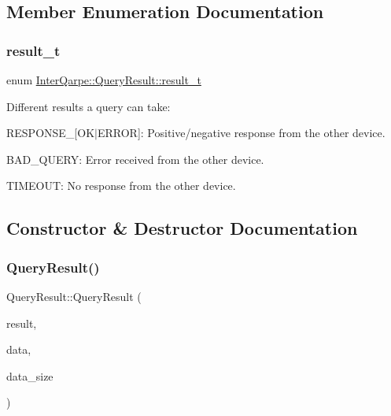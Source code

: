 \subsection{Member Enumeration Documentation}
\mbox{\label{classInterQarpe_1_1QueryResult_ad265093e5dea69f229df989d4e18cbb4}} 
\subsubsection{\texorpdfstring{result\+\_\+t}{result\_t}}
{\footnotesize\ttfamily enum \hyperlink{classInterQarpe_1_1QueryResult_ad265093e5dea69f229df989d4e18cbb4}{Inter\+Qarpe\+::\+Query\+Result\+::result\+\_\+t}}

Different results a query can take\+:
\begin{DoxyItemize}
\item R\+E\+S\+P\+O\+N\+S\+E\+\_\+\mbox{[}O\+K$\vert$\+E\+R\+R\+OR\mbox{]}\+: Positive/negative response from the other device.
\item B\+A\+D\+\_\+\+Q\+U\+E\+RY\+: Error received from the other device.
\item T\+I\+M\+E\+O\+UT\+: No response from the other device. 
\end{DoxyItemize}

\subsection{Constructor \& Destructor Documentation}
\mbox{\label{classInterQarpe_1_1QueryResult_a352263dc06a25fbb1c6ac075ac8a7420}} 
\subsubsection{\texorpdfstring{Query\+Result()}{QueryResult()}}
{\footnotesize\ttfamily Query\+Result\+::\+Query\+Result (\begin{DoxyParamCaption}\item[{\hyperlink{classInterQarpe_1_1QueryResult_ad265093e5dea69f229df989d4e18cbb4}{Query\+Result\+::result\+\_\+t}}]{result,  }\item[{uint8\+\_\+t $\ast$}]{data,  }\item[{size\+\_\+t}]{data\+\_\+size }\end{DoxyParamCaption})}

